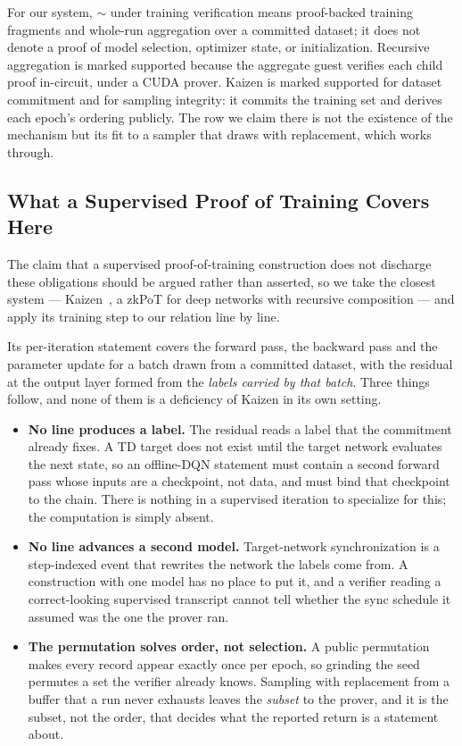 \begin{table}[!t]
\begin{minipage}{0.96\textwidth}
\footnotesize
For our system, $\sim$ under training verification means proof-backed
training fragments and whole-run aggregation over a committed dataset; it does
not denote a proof of model selection, optimizer state, or initialization.
Recursive aggregation is marked supported because the aggregate guest verifies
each child proof in-circuit, under a CUDA prover. Kaizen is marked supported
for dataset commitment and for sampling integrity: it commits the training set
and derives each epoch's ordering publicly. The row we claim there is not the
existence of the mechanism but its fit to a sampler that draws with
replacement, which  works through.
\end{minipage}
\end{table}

\subsection{What a Supervised Proof of Training Covers Here}
\label{subsec:kaizen-applied}

The claim that a supervised proof-of-training construction does not discharge
these obligations should be argued rather than asserted, so we take the closest
system --- Kaizen~\cite{kaizen2024}, a zkPoT for deep networks with recursive
composition --- and apply its training step to our relation line by line.

Its per-iteration statement covers the forward pass, the backward pass and the
parameter update for a batch drawn from a committed dataset, with the residual
at the output layer formed from the \emph{labels carried by that batch}. Three
things follow, and none of them is a deficiency of Kaizen in its own setting.

\begin{itemize}[leftmargin=1.5em]
  \item \textbf{No line produces a label.} The residual reads a label that the
  commitment already fixes. A TD target does not exist until the target network
  evaluates the next state, so an offline-DQN statement must contain a second
  forward pass whose inputs are a checkpoint, not data, and must bind that
  checkpoint to the chain. There is nothing in a supervised iteration to
  specialize for this; the computation is simply absent.
  \item \textbf{No line advances a second model.} Target-network
  synchronization is a step-indexed event that rewrites the network the labels
  come from. A construction with one model has no place to put it, and a
  verifier reading a correct-looking supervised transcript cannot tell whether
  the sync schedule it assumed was the one the prover ran.
  \item \textbf{The permutation solves order, not selection.} A public
  permutation makes every record appear exactly once per epoch, so grinding the
  seed permutes a set the verifier already knows. Sampling with replacement
  from a buffer that a run never exhausts leaves the \emph{subset} to the
  prover, and it is the subset, not the order, that decides what the reported
  return is a statement about.
\end{itemize}

